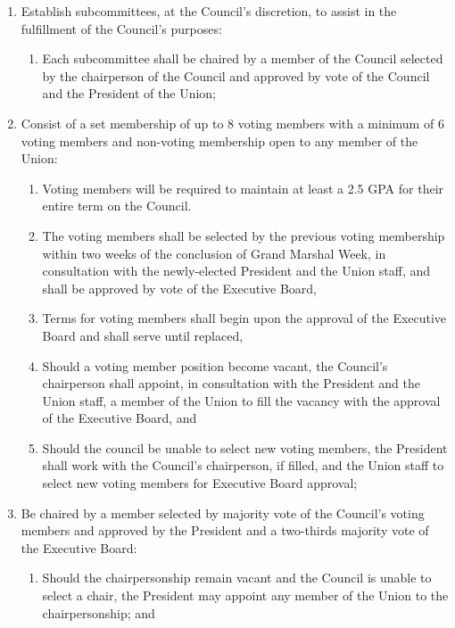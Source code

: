 \begin{enumerate}
\begin{enumerate}
\begin{enumerate}
    \item Operate in any additional capacities outlined in the Council’s Bylaws;
    \end{enumerate}
  \item Establish subcommittees, at the Council’s discretion, to assist in the fulfillment of the Council’s purposes:
    \begin{enumerate}
    \item Each subcommittee shall be chaired by a member of the Council selected by the chairperson of the Council and approved by vote of the Council and the President of the Union;
    \end{enumerate}
  \item Consist of a set membership of up to 8 voting members with a minimum of 6 voting members and non-voting membership open to any member of the Union:
    \begin{enumerate}
    \item Voting members will be required to maintain at least a 2.5 GPA for their entire term on the Council.
    \item The voting members shall be selected by the previous voting membership within two weeks of the conclusion of Grand Marshal Week, in consultation with the newly-elected President and the Union staff, and shall be approved by vote of the Executive Board,
    \item Terms for voting members shall begin upon the approval of the Executive Board and shall serve until replaced,
    \item Should a voting member position become vacant, the Council’s chairperson shall appoint, in consultation with the President and the Union staff, a member of the Union to fill the vacancy with the approval of the Executive Board, and
    \item Should the council be unable to select new voting members, the President shall work with the Council’s chairperson, if filled, and the Union staff to select new voting members for Executive Board approval;
    \end{enumerate}
  \item Be chaired by a member selected by majority vote of the Council’s voting members and approved by the President and a two-thirds majority vote of the Executive Board:
    \begin{enumerate}
    \item Should the chairpersonship remain vacant and the Council is unable to select a chair, the President may appoint any member of the Union to the chairpersonship; and

\end{enumerate}
\end{enumerate}
\end{enumerate}
